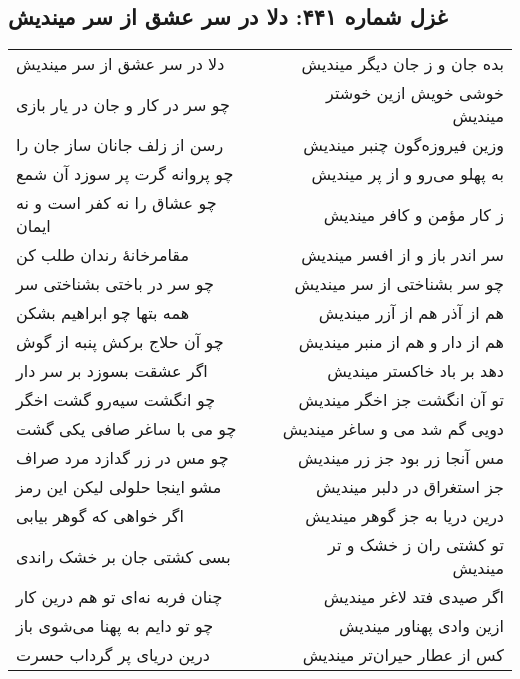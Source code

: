 \begin{center}
\section*{غزل شماره ۴۴۱: دلا در سر عشق از سر میندیش}
\label{sec:441}
\begin{longtable}{l p{0.5cm} r}
دلا در سر عشق از سر میندیش
&&
بده جان و ز جان دیگر میندیش
\\
چو سر در کار و جان در یار بازی
&&
خوشی خویش ازین خوشتر میندیش
\\
رسن از زلف جانان ساز جان را
&&
وزین فیروزه‌گون چنبر میندیش
\\
چو پروانه گرت پر سوزد آن شمع
&&
به پهلو می‌رو و از پر میندیش
\\
چو عشاق را نه کفر است و نه ایمان
&&
ز کار مؤمن و کافر میندیش
\\
مقامرخانهٔ رندان طلب کن
&&
سر اندر باز و از افسر میندیش
\\
چو سر در باختی بشناختی سر
&&
چو سر بشناختی از سر میندیش
\\
همه بتها چو ابراهیم بشکن
&&
هم از آذر هم از آزر میندیش
\\
چو آن حلاج برکش پنبه از گوش
&&
هم از دار و هم از منبر میندیش
\\
اگر عشقت بسوزد بر سر دار
&&
دهد بر باد خاکستر میندیش
\\
چو انگشت سیه‌رو گشت اخگر
&&
تو آن انگشت جز اخگر میندیش
\\
چو می با ساغر صافی یکی گشت
&&
دویی گم شد می و ساغر میندیش
\\
چو مس در زر گدازد مرد صراف
&&
مس آنجا زر بود جز زر میندیش
\\
مشو اینجا حلولی لیکن این رمز
&&
جز استغراق در دلبر میندیش
\\
اگر خواهی که گوهر بیابی
&&
درین دریا به جز گوهر میندیش
\\
بسی کشتی جان بر خشک راندی
&&
تو کشتی ران ز خشک و تر میندیش
\\
چنان فربه نه‌ای تو هم درین کار
&&
اگر صیدی فتد لاغر میندیش
\\
چو تو دایم به پهنا می‌شوی باز
&&
ازین وادی پهناور میندیش
\\
درین دریای پر گرداب حسرت
&&
کس از عطار حیران‌تر میندیش
\\
\end{longtable}
\end{center}
